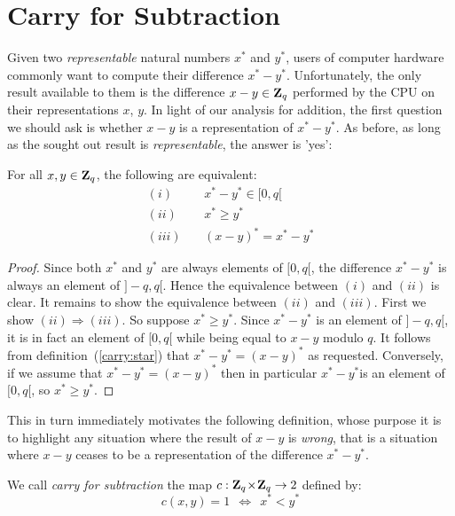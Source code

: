 \documentclass{article}
\newcommand{\zq}{\mbox{${\bf Z}_{q}$}}
\begin{document}
\section{Carry for Subtraction}
Given two {\em representable} natural numbers $x^{*}$ and $y^{*}$, users of
computer hardware commonly want to compute their difference $x^{*}-y^{*}$. 
Unfortunately, the only result available to them is the difference $x-y\in\zq$
performed by the CPU on their representations $x$, $y$. In light of our
analysis for addition, the first question we should ask is whether $x-y$ 
is a representation of $x^{*}-y^{*}$. As before, as long as the sought out 
result is {\em representable}, the answer is 'yes':
\begin{prop}\label{carry:unsigned:sub:morphism}
  For all $x,y\in\zq$, the following are equivalent:
    \begin{eqnarray*}
      (i)&\ &x^{*}-y^{*}\in[0,q[\\
      (ii)&\ &x^{*}\geq y^{*}\\
      (iii)&\ &(x-y)^{*}=x^{*}-y^{*}
    \end{eqnarray*}
\end{prop}
\begin{proof}
Since both $x^{*}$ and $y^{*}$ are always elements of $[0,q[$, the difference
  $x^{*}-y^{*}$ is always an element of $]-q,q[$. Hence the equivalence between
  $(i)$ and $(ii)$ is clear. It remains to show the equivalence between $(ii)$
  and $(iii)$. First we show $(ii)\Rightarrow(iii)$. So suppose 
  $x^{*} \geq y^{*}$. Since $x^{*}-y^{*}$ is an element of $]-q,q[$, it is
  in fact an element of $[0,q[$ while being equal to $x-y$ modulo $q$. It
  follows from definition~(\ref{carry:star}) that $x^{*}-y^{*}=(x-y)^{*}$
  as requested. Conversely, if we assume that $x^{*}-y^{*}=(x-y)^{*}$ then
  in particular $x^{*}-y^{*}$is an element of $[0,q[$, so $x^{*}\geq y^{*}$.
\end{proof}

This in turn immediately motivates the following definition, whose purpose
it is to highlight any situation where the result of $x-y$ is {\em wrong}, that
is a situation where $x-y$ ceases to be a representation of the difference 
$x^{*}-y^{*}$.

\begin{defin}\label{carry:unsigned:sub:carry}
We call {\em carry for subtraction} the map $c:\zq\!\times\!\zq\rightarrow2$ defined by:
  \[
    c(x,y) = 1  \ \ \Leftrightarrow\ \ x^{*} < y^{*}
  \]
\end{defin}
\end{document}
